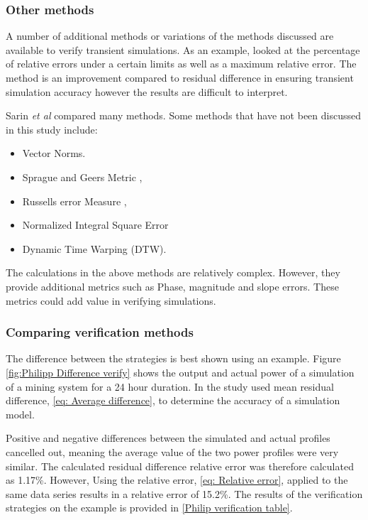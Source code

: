  		\subsubsection{Other methods}
 		A number of additional methods or variations of the methods discussed are available to verify transient simulations. As an example, \cite{arndt2007integrated} looked at the percentage of relative errors under a certain limits as well as a maximum relative error. The method is an improvement compared to residual difference in ensuring transient simulation accuracy however the results are difficult to interpret.
 		\par
 		Sarin \textit{et al} \cite{sarin2010comparing} compared many methods. Some methods that have not been discussed in this study include:
 		\begin{itemize}
 			\item Vector Norms.
 			\item Sprague and Geers Metric \cite{Geers1984Objective}, \cite{Sprague2004Spectral}
 			\item Russells error Measure \cite{Russell1}, \cite{Russell2}
 			\item Normalized Integral Square Error
 			\item Dynamic Time Warping (DTW).
 		\end{itemize}
 		The calculations in the above methods are relatively complex. However, they provide additional metrics such as Phase, magnitude and slope errors. These metrics could add value in verifying simulations.
 		\subsubsection{Comparing verification methods}
 		The difference between the strategies is best shown using an example. Figure \cref{fig:Philipp Difference verify} shows the output and actual power of a simulation of a mining system for a 24 hour duration. In the study \cite{Mare2016PhD} used mean residual difference, \cref{eq: Average difference}, to determine the accuracy of a simulation model.
 		\par 
 		 Positive and negative differences between the simulated and actual profiles cancelled out, meaning the average value of the two power profiles were very similar. The calculated residual difference relative error was therefore calculated as 1.17\%. However, Using the relative error, \cref{eq: Relative error}, applied to the same data series results in a relative error of 15.2\%. The results of the verification strategies on the example is provided in \cref{Philip verification table}. 
 		
